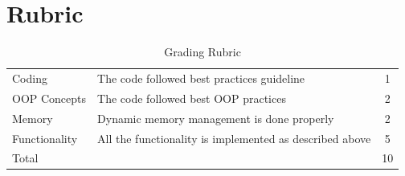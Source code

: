\documentclass[a4paper,12pt]{article}
\begin{document}
\section{Rubric}
\begin{table}[!h]
	\centering
	\begin{tabular}{llc}
		\toprule
		Coding	& The code followed best practices guideline &	1 \\
		OOP Concepts & The code followed best OOP practices & 2 \\
		 Memory &	Dynamic memory management is done properly	& 2\\
		Functionality	& All the functionality is implemented as described above	& 5 \\
		\midrule
		Total & & 10\\
		\bottomrule
	\end{tabular}
	\caption{Grading Rubric}
	\label{Grading}
\end{table}


	
	
\end{document}
